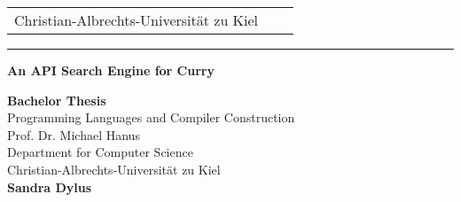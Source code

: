 \documentclass[%
	latex,%
	a4paper,%
	oneside,%
	chapterprefix,%
	headsepline,%
	12pt%
]{scrbook}
\begin{document}


\newcommand{\trtitle}{An API Search Engine for Curry}
\newcommand{\trtype}{Bachelor Thesis}
\newcommand{\trauthor}{Sandra Dylus}
\newcommand{\trstrasse}{Gutenbergstra\ss e 3}
\newcommand{\trmatrikelnummer}{1083}
\newcommand{\trort}{24116 Kiel}
\newcommand{\trbetreuer}{M.o.Sc. Bj\"orn Peem\"oller}
\newcommand{\trprof}{Prof. Dr. Michael Hanus}
\newcommand{\trfachgebiet}{Programming Languages and Compiler Construction}
\newcommand{\trinstitut}{Computer Science}
\newcommand{\trfakultaet}{Technische Fakult\"at}
\newcommand{\truni}{Christian-Albrechts-Universit\"at zu Kiel}
\newcommand{\trdate}{\today}

\thispagestyle{empty}

\begin{tabular}{lcr}
\truni 
  \\
\end{tabular}

\rule{\textwidth}{0.4pt}

\vspace{2.5cm}
\begin{center}
  \textbf{\LARGE \trtitle}
\end{center}
\vspace{2cm}

\begin{center}
  \textbf{\trtype} \\
  \trfachgebiet \\
  \trprof \\
  Department for \trinstitut \\
  \truni \\[0.5cm]
  \textbf{\trauthor}
\end{center}
\end{document}
